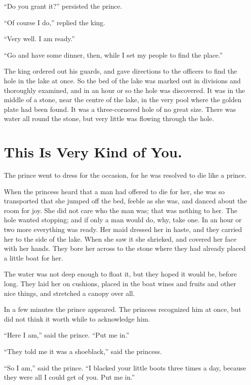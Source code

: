 \documentclass[12pt]{memoir}
\begin{document}
``Do you grant it?'' persisted the prince.

``Of course I do,'' replied the king.

``Very well.  I am ready.''

``Go and have some dinner, then, while I set my people to find the
place.''

The king ordered out his guards, and gave directions to the officers
to find the hole in the lake at once.  So the bed of the lake was
marked out in divisions and thoroughly examined, and in an hour or so
the hole was discovered.  It was in the middle of a stone, near the
centre of the lake, in the very pool where the golden plate had been
found.  It was a three-cornered hole of no great size.  There was
water all round the stone, but very little was flowing through the
hole.


\chapter{This Is Very Kind of You.}


The prince went to dress for the occasion, for he was resolved to die
like a prince.

When the princess heard that a man had offered to die for her, she was
so transported that she jumped off the bed, feeble as she was, and
danced about the room for joy.  She did not care who the man was; that
was nothing to her.  The hole wanted stopping; and if only a man would
do, why, take one.  In an hour or two more everything was ready.  Her
maid dressed her in haste, and they carried her to the side of the
lake.  When she saw it she shrieked, and covered her face with her
hands.  They bore her across to the stone where they had already
placed a little boat for her.

The water was not deep enough to float it, but they hoped it would be,
before long.  They laid her on cushions, placed in the boat wines and
fruits and other nice things, and stretched a canopy over all.

In a few minutes the prince appeared.  The princess recognized him at
once, but did not think it worth while to acknowledge him.

``Here I am,'' said the prince.  ``Put me in.''

``They told me it was a shoeblack,'' said the princess.

``So I am,'' said the prince.  ``I blacked your little boots three
times a day, because they were all I could get of you.  Put me in.''
\end{document}
